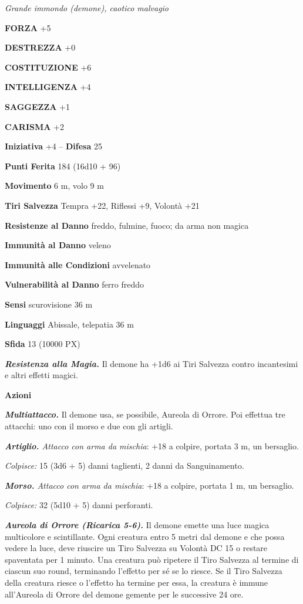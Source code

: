 \begin{multicols}{2}
\textit{Grande immondo (demone), caotico malvagio}

\textbf{FORZA} +5

\textbf{DESTREZZA} +0

\textbf{COSTITUZIONE} +6

\textbf{INTELLIGENZA} +4

\textbf{SAGGEZZA} +1

\textbf{CARISMA} +2

\textbf{Iniziativa} +4 -- \textbf{Difesa} 25

\textbf{Punti Ferita} 184 (16d10 + 96)

\textbf{Movimento} 6 m, volo 9 m

\textbf{Tiri Salvezza} Tempra +22, Riflessi +9, Volontà +21

\textbf{Resistenze al Danno} freddo, fulmine, fuoco; da arma non magica

\textbf{Immunità al Danno} veleno

\textbf{Immunità alle Condizioni} avvelenato

\textbf{Vulnerabilità al Danno} ferro freddo

\textbf{Sensi} scurovisione 36 m

\textbf{Linguaggi} Abissale, telepatia 36 m

\textbf{Sfida} 13 (10000 PX)

\textit{\textbf{Resistenza alla Magia.}} Il demone ha +1d6 ai Tiri Salvezza contro incantesimi e altri effetti magici.

\textbf{Azioni}

\textit{\textbf{Multiattacco.}} Il demone usa, se possibile, Aureola di Orrore. Poi effettua tre attacchi: uno con il morso e due con gli artigli.

\textit{\textbf{Artiglio.} Attacco con arma da mischia}: +18 a colpire, portata 3 m, un bersaglio.

\textit{Colpisce:} 15 (3d6 + 5) danni taglienti, 2 danni da Sanguinamento.

\textit{\textbf{Morso.} Attacco con arma da mischia}: +18 a colpire, portata 1 m, un bersaglio.

\textit{Colpisce:} 32 (5d10 + 5) danni perforanti.

\textit{\textbf{Aureola di Orrore (Ricarica 5-6).}} Il demone emette una luce magica multicolore e scintillante. Ogni creatura entro 5 metri dal demone e che possa vedere la luce, deve riuscire un Tiro Salvezza su Volontà DC 15 o restare spaventata per 1 minuto. Una creatura può ripetere il Tiro Salvezza al termine di ciascun suo round, terminando l'effetto per sé se lo riesce. Se il Tiro Salvezza della creatura riesce o l'effetto ha termine per essa, la creatura è immune all'Aureola di
Orrore del demone gemente per le successive 24 ore.


\end{multicols}
